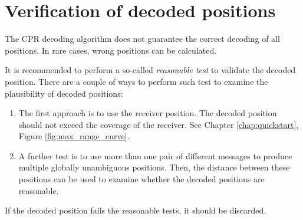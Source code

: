 \section{Verification of decoded positions}

The CPR decoding algorithm does not guarantee the correct decoding of all positions. In rare cases, wrong positions can be calculated. 

It is recommended to perform a so-called \emph{reasonable test} to validate the decoded position. There are a couple of ways to perform such test to examine the plausibility of decoded positions:

\begin{enumerate}
  \item The first approach is to use the receiver position. The decoded position should not exceed the coverage of the receiver. See Chapter \ref{chap:quickstart}, Figure \ref{fig:max_range_curve}.

  \item A further test is to use more than one pair of different messages to produce multiple globally unambiguous positions. Then, the distance between these positions can be used to examine whether the decoded positions are reasonable.
\end{enumerate}

If the decoded position fails the reasonable tests, it should be discarded.
